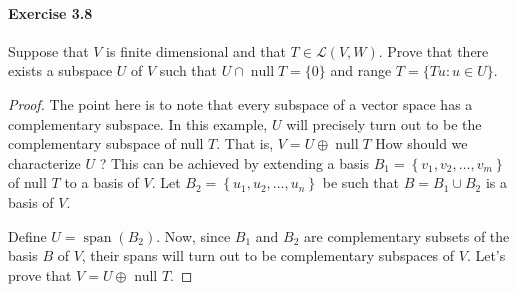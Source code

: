 \documentclass{article}
\theoremstyle{definition}
\begin{document}
\paragraph{Exercise 3.8} Suppose that $V$ is finite dimensional and that $T \in \mathcal{L}(V, W)$. Prove that there exists a subspace $U$ of $V$ such that $U \cap \operatorname{null} T=\{0\}$ and range $T=\{T u: u \in U\}$.
\begin{proof}
    The point here is to note that every subspace of a vector space has a complementary subspace.
In this example, $U$ will precisely turn out to be the complementary subspace of null $T$. That is, $V=U \oplus \operatorname{null} T$
How should we characterize $U$ ? This can be achieved by extending a basis $B_1=\left\{v_1, v_2, \ldots, v_m\right\}$ of null $T$ to a basis of $V$. Let $B_2=\left\{u_1, u_2, \ldots, u_n\right\}$ be such that $B=B_1 \cup B_2$ is a basis of $V$.

Define $U=\operatorname{span}\left(B_2\right)$. Now, since $B_1$ and $B_2$ are complementary subsets of the basis $B$ of $V$, their spans will turn out to be complementary subspaces of $V$. Let's prove that $V=U \oplus$ null $T$.


\end{proof}
\end{document}
